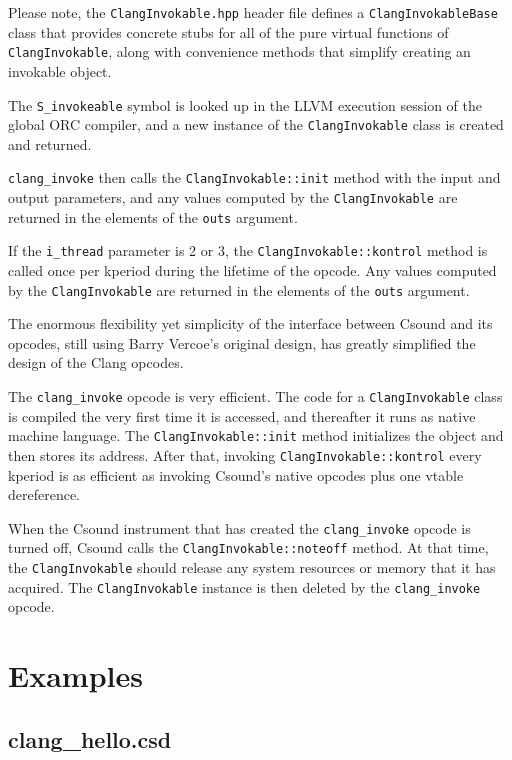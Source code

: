 \documentclass[letterpaper, 12pt]{article}
\begin{document}
Please note, the \verb|ClangInvokable.hpp| header file defines a \verb|ClangInvokableBase| class that provides concrete stubs for all of the pure virtual functions of \verb|ClangInvokable|, along with convenience methods that simplify creating an invokable object.

The \verb|S_invokeable| symbol is looked up in the LLVM execution session 
of the global ORC compiler, and a new instance of the \verb|ClangInvokable| class 
is created and returned.

\verb|clang_invoke| then calls the \verb|ClangInvokable::init| method with 
the input and output parameters, and any values computed by the 
\verb|ClangInvokable| are returned in the elements of the \verb|outs| argument.

If the \verb|i_thread| parameter is 2 or 3, the \verb|ClangInvokable::kontrol| method is 
called once per kperiod during the lifetime of the opcode. Any values 
computed by the \verb|ClangInvokable| are returned in the elements of the \verb|outs| argument. 

The enormous flexibility yet simplicity of the interface between Csound and its opcodes, still using Barry Vercoe's original design, has greatly simplified the design of the Clang opcodes.

The \verb|clang_invoke| opcode is very efficient. The code for a \verb|ClangInvokable| class is compiled the very first time it is accessed, and thereafter it runs as native machine language. The \verb|ClangInvokable::init| method initializes the object and then stores its address. After that, invoking \verb|ClangInvokable::kontrol| every kperiod is as efficient as invoking Csound's native opcodes plus one vtable dereference.

When the Csound instrument that has created the \verb|clang_invoke| opcode is 
turned off, Csound calls the \verb|ClangInvokable::noteoff| method. At that 
time, the \verb|ClangInvokable| should release any system resources or memory 
that it has acquired. 
The \verb|ClangInvokable| instance is then deleted by the \verb|clang_invoke| opcode.

\section{Examples}

\subsection{clang\_hello.csd}
\end{document}

